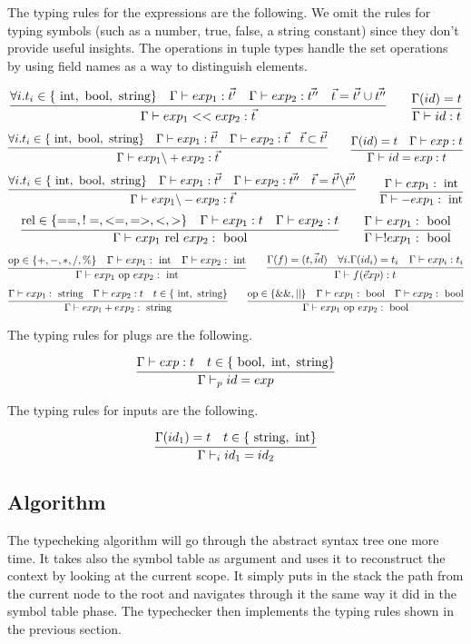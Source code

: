 \documentclass{WigReport}
\begin{document}
The typing rules for the expressions are the following. We omit the rules for typing symbols (such as a number, true, false, a string constant) since they don't provide useful insights. The operations in tuple types handle the set operations by using field names as a way to distinguish elements.

$$\infer{\Gamma \vdash exp_1 << exp_2 : \vec t}
      { \forall i.t_i \in \{\inttp, \bool, \stringtp\} & \Gamma \vdash exp_1 : \vec {t'}
        & \Gamma \vdash exp_2 : \vec {t''} & \vec t = \vec {t'} \cup \vec {t''}} \qquad
\infer{\Gamma \vdash id : t}{\Gamma(id) = t}$$
$$\infer{\Gamma \vdash exp_1 \backslash+ exp_2 : \vec t}
      { \forall i.t_i \in \{\inttp, \bool, \stringtp\} & \Gamma \vdash exp_1 : \vec {t'}
        & \Gamma \vdash exp_2 : \vec {t} & \vec t \subset \vec {t'}}\qquad
\infer{\Gamma \vdash id = exp : t}{\Gamma(id) = t & \Gamma \vdash exp : t}$$
$$\infer{\Gamma \vdash exp_1 \backslash- exp_2 : \vec t}
      { \forall i.t_i \in \{\inttp, \bool, \stringtp\} & \Gamma \vdash exp_1 : \vec {t'}
        & \Gamma \vdash exp_2 : \vec {t''} & \vec t = \vec {t'} \backslash \vec {t''}}
\qquad \infer{\Gamma \vdash {- exp_1} : \inttp}{\Gamma \vdash exp_1 : \inttp}$$
$$\infer{\Gamma \vdash exp_1 \text{ rel } exp_2 : \bool}
      {\text{rel} \in \{==, !=, <=, =>, <, >\} & \Gamma \vdash exp_1 : t 
        & \Gamma \vdash exp_2 : t}\qquad
\infer{\Gamma \vdash ! exp_1 : \bool}{\Gamma \vdash exp_1 : \bool}$$
$$\infer{\Gamma \vdash exp_1 \text{ op } exp_2 : \inttp}
      {\text{op} \in \{+,-,*,/,\%\} & \Gamma \vdash exp_1 : \inttp 
        & \Gamma \vdash exp_2 : \inttp}\qquad 
\infer{\Gamma \vdash f(\vec exp) : t}
      {\Gamma(f) = (t, \vec id) & \forall i.\Gamma(id_i) = t_i & \Gamma \vdash exp_i : t_i}
$$
$$\infer{\Gamma \vdash exp_1 + exp_2 : \stringtp}
      {\Gamma \vdash exp_1 : \stringtp & \Gamma \vdash exp_2 : t & t \in \{\inttp, \stringtp\}}
\qquad
\infer{\Gamma \vdash exp_1 \text{ op } exp_2 : \bool}
      {\text{op} \in \{\&\&, ||\} & \Gamma \vdash exp_1 : \bool & \Gamma \vdash exp_2 : \bool}$$

The typing rules for plugs are the following.

$$\infer{\Gamma \vdash_p id = exp}{\Gamma \vdash exp : t & t \in \{\bool, \inttp, \stringtp\}}$$

The typing rules for inputs are the following.

$$\infer{\Gamma \vdash_i id_1 = id_2}{\Gamma (id_1) = t & t \in \{\stringtp, \inttp\}}$$

\subsection{Algorithm}
The typecheking algorithm will go through the abstract syntax tree one more time. It takes also the symbol table as argument and uses it to reconstruct the context by looking at the current scope. It simply puts in the stack the path from the current node to the root and navigates through it the same way it did in the symbol table phase. The typechecker then implements the typing rules shown in the previous section. 
\end{document}
